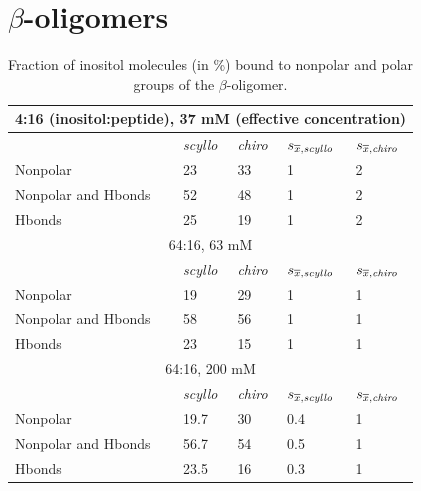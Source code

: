 \clearpage
\newpage

\section{$\beta$-oligomers}

\begin{table}[ht]
\centering
\begin{tabular}{|lllll|}
\hline
\multicolumn{5}{|c|}{4:16 (inositol:peptide), 37 mM (effective concentration)} \\
\hline
& \emph{scyllo} & \emph{chiro} & $s_{\overline{x}, \emph{scyllo}}$ & $s_{\overline{x}, \emph{chiro}}$ \\
\hline
Nonpolar & 23 & 33 & 1 & 2 \\
Nonpolar and Hbonds & 52 & 48 & 1 & 2 \\
Hbonds & 25 & 19 & 1 & 2 \\
\hline
\hline
\multicolumn{5}{|c|}{64:16, 63 mM} \\
\hline
& \emph{scyllo} & \emph{chiro} & $s_{\overline{x}, \emph{scyllo}}$ & $s_{\overline{x}, \emph{chiro}}$ \\ 
\hline
Nonpolar & 19 & 29 & 1 & 1 \\
Nonpolar and Hbonds & 58 & 56 & 1 & 1\\
Hbonds & 23 & 15 & 1 & 1 \\
\hline
\hline
\multicolumn{5}{|c|}{64:16, 200 mM} \\
\hline
& \emph{scyllo} & \emph{chiro} & $s_{\overline{x}, \emph{scyllo}}$ & $s_{\overline{x}, \emph{chiro}}$ \\
\hline
Nonpolar & 19.7 & 30 & 0.4 & 1 \\
Nonpolar and Hbonds & 56.7 & 54 & 0.5 & 1 \\
Hbonds & 23.5 & 16 & 0.3 & 1 \\
\hline
\end{tabular}
\caption{Fraction of inositol molecules (in \%) bound to nonpolar and polar groups of the $\beta$-oligomer.}    
\label{tbl:SI-betaBindingMode}
\end{table}

